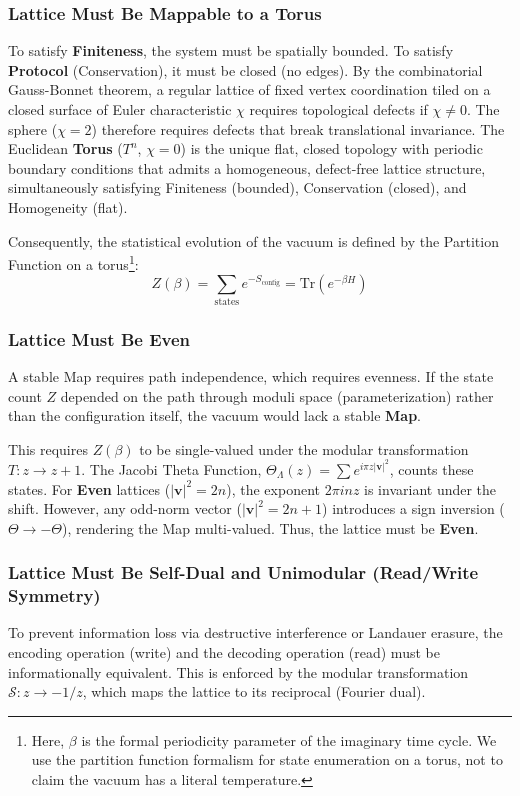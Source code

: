 \subsubsection{Lattice Must Be Mappable to a Torus}
\label{sec:torus}

To satisfy \textbf{Finiteness}, the system must be spatially bounded. To satisfy \textbf{Protocol} (Conservation), it must be closed (no edges). By the combinatorial Gauss-Bonnet theorem, a regular lattice of fixed vertex coordination tiled on a closed surface of Euler characteristic $\chi$ requires topological defects if $\chi \neq 0$. The sphere ($\chi = 2$) therefore requires defects that break translational invariance. The Euclidean \textbf{Torus} ($T^n$, $\chi=0$) is the unique flat, closed topology with periodic boundary conditions that admits a homogeneous, defect-free lattice structure, simultaneously satisfying Finiteness (bounded), Conservation (closed), and Homogeneity (flat).

Consequently, the statistical evolution of the vacuum is defined by the Partition Function on a torus\footnote{Here, $\beta$ is the formal periodicity parameter of the imaginary time cycle. We use the partition function formalism for state enumeration on a torus, not to claim the vacuum has a literal temperature.}:
\begin{equation}
    Z(\beta) = \sum_{\text{states}} e^{-S_{\text{config}}} = \text{Tr}(e^{-\beta H})
\end{equation}

\subsubsection{Lattice Must Be Even}
\label{sec:even}
A stable Map requires path independence, which requires evenness. If the state count $Z$ depended on the path through moduli space (parameterization) rather than the configuration itself, the vacuum would lack a stable \textbf{Map}.

This requires $Z(\beta)$ to be single-valued under the modular transformation $T: z \to z+1$. The Jacobi Theta Function, $\Theta_\Lambda(z) = \sum e^{i \pi z |\mathbf{v}|^2}$, counts these states. For \textbf{Even} lattices ($|\mathbf{v}|^2 = 2n$), the exponent $2\pi i n z$ is invariant under the shift. However, any odd-norm vector ($|\mathbf{v}|^2 = 2n+1$) introduces a sign inversion ($\Theta \to -\Theta$), rendering the Map multi-valued. Thus, the lattice must be \textbf{Even}.

\subsubsection{Lattice Must Be Self-Dual and Unimodular (Read/Write Symmetry)}
To prevent information loss via destructive interference or Landauer erasure, the encoding operation (write) and the decoding operation (read) must be informationally equivalent. This is enforced by the modular transformation $\mathcal{S}: z \to -1/z$, which maps the lattice to its reciprocal (Fourier dual).

